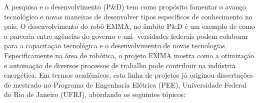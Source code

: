 A pesquisa e o desenvolvimento (P\&D) tem como propósito fomentar o avanço
tecnológico e novas maneiras de desenvolver tipos específicos de conhecimento
no país. O desenvolvimento do robô EMMA, no âmbito P\&D é um exemplo de como a
parceria entre agências do governo e uni- versidades federais podem colaborar
para a capacitação tecnológica e o desenvolvimento de novas tecnologias.
Especificamente na área de robótica, o projeto EMMA mostra como a otimização e
automação de diversos processos de trabalho pode contribuir na indústria
energética. Em termos acadêmicos, esta linha de projetos já originou %
dissertações de mestrado no Programa de Engenharia Elétrica (PEE), Universidade
Federal do Rio de Janeiro (UFRJ), abordando os seguintes tópicos:






